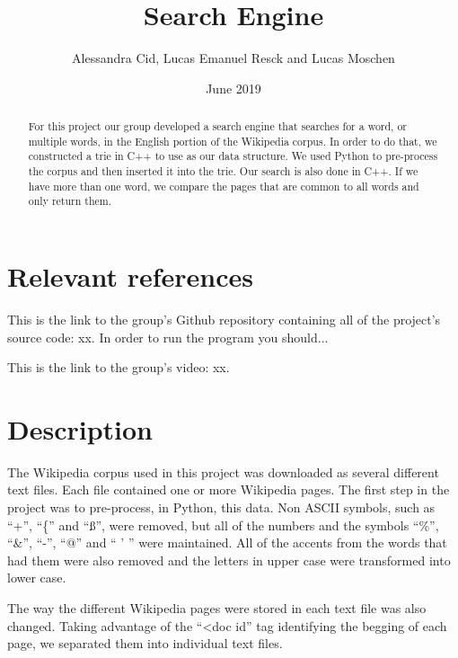 \documentclass{article}
\title{Search Engine}
\author{Alessandra Cid, Lucas Emanuel Resck  
and Lucas Moschen}
\date{June 2019}
\begin{document}
\maketitle

\begin{abstract}
For this project our group developed a search engine that searches for a word, or multiple words, in the English portion of the Wikipedia corpus. In order to do that, we constructed a trie in C++ to use as our data structure. We used Python to pre-process the corpus and then inserted it into the trie. Our search is also done in C++. If we have more than one word, we compare the pages that are common to all words and only return them. 
\end{abstract}

\section*{Relevant references}
This is the link to the group's Github repository containing all of the project's 
source code: xx. In order to run the program you should...

This is the link to the group's video: xx. 

\section*{Description}
The Wikipedia corpus used in this project was downloaded as several different text files. Each file contained one or more Wikipedia pages. The first step in the project was to pre-process, in Python, this data. Non ASCII symbols, such as ``+'', ``\{'' and ``ß'', were removed, but all of the numbers and the symbols ``\%'', ``\&'', ``-'', ``@'' and `` ' '' were maintained. All of the accents from the words that had them were also removed and the letters in upper case were transformed into lower case. 

The way the different Wikipedia pages were stored in each text file was also changed. Taking advantage of the ``<doc id'' tag identifying the begging of each page, we separated them into individual text files. 
\end{document}
